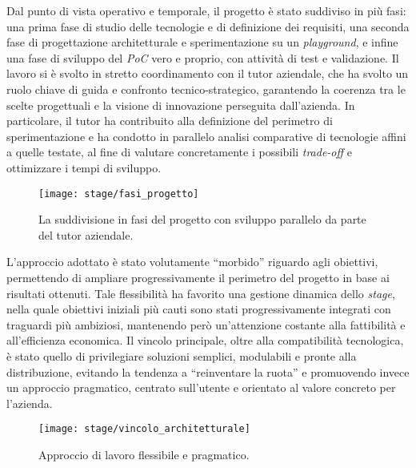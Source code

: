 Dal punto di vista operativo e temporale, il progetto è stato suddiviso in più fasi: una prima fase di studio delle tecnologie e di definizione dei requisiti, 
una seconda fase di progettazione architetturale e sperimentazione su un \emph{playground}, e infine una fase di sviluppo del \emph{PoC} vero e proprio, con attività di test e validazione. 
Il lavoro si è svolto in stretto coordinamento con il tutor aziendale, che ha svolto un ruolo chiave di guida e confronto tecnico-strategico, garantendo la coerenza tra 
le scelte progettuali e la visione di innovazione perseguita dall’azienda. 
In particolare, il tutor ha contribuito alla definizione del perimetro di sperimentazione e 
ha condotto in parallelo analisi comparative di tecnologie affini a quelle testate, al fine di valutare concretamente i possibili \emph{trade-off} e ottimizzare i tempi di sviluppo.
\begin{figure}[htbp]
    \centering
    \texttt{[image: stage/fasi\_progetto]}
    \caption{La suddivisione in fasi del progetto con sviluppo parallelo da parte del tutor aziendale.}
    \label{fig:fasi_progetto}
  \end{figure}
L’approccio adottato è stato volutamente “morbido” riguardo agli obiettivi, permettendo di ampliare progressivamente il perimetro del progetto in base ai risultati ottenuti. 
Tale flessibilità ha favorito una gestione dinamica dello \emph{stage}, nella quale obiettivi iniziali più cauti sono stati progressivamente integrati con traguardi più ambiziosi, 
mantenendo però un’attenzione costante alla fattibilità e all’efficienza economica. 
Il vincolo principale, oltre alla compatibilità tecnologica, è stato quello di privilegiare soluzioni semplici, modulabili e pronte alla distribuzione, evitando la tendenza a “reinventare la ruota” 
e promuovendo invece un approccio pragmatico, centrato sull’utente e orientato al valore concreto per l’azienda.
\begin{figure}[htbp]
    \centering
    \texttt{[image: stage/vincolo\_architetturale]}
    \caption{Approccio di lavoro flessibile e pragmatico.}
    \label{fig:vincolo_architetturale}
\end{figure}

